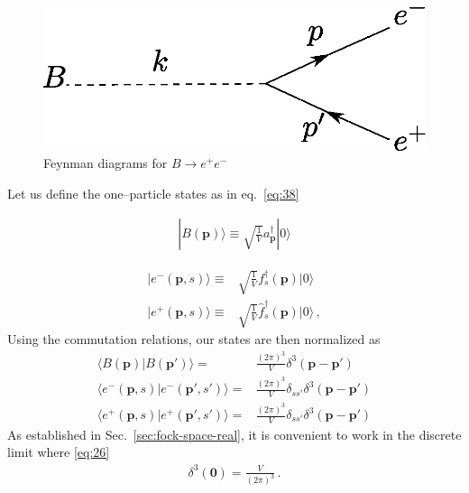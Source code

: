 \begin{figure} %
  \centering %
  \includegraphics[scale=0.6]{Btoee} %
  \caption{Feynman diagrams for $B\to e^+ e^-$} %
  \label{fig:btoee} %
\end{figure} %
Let us define the one--particle states as in eq.~\eqref{eq:38}

\begin{align}
  | B(\mathbf{p})\rangle\equiv\sqrt{\frac{1}{V}}a^\dagger_{\mathbf{p}}|0\rangle 
\end{align}
 
\begin{align}
   | e^-(\mathbf{p},s)\rangle\equiv&\sqrt{\frac{1}{V}}f^\dagger_s(\mathbf{p})|0\rangle\nonumber\\
   | e^+(\mathbf{p},s)\rangle\equiv&\sqrt{\frac{1}{V}}\hat{f}^\dagger_s(\mathbf{p})|0\rangle\,, 
\end{align}
Using the commutation relations, our states are then normalized as
\begin{align}
\langle B(\mathbf{p})| B(\mathbf{p}')\rangle=&\frac{(2\pi)^3}{V}\delta^3(\mathbf{p}-\mathbf{p}')\nonumber\\
\langle e^-(\mathbf{p},s)| e^-(\mathbf{p}',s')\rangle=&\frac{(2\pi)^3}{V}\delta_{s s'}\delta^3(\mathbf{p}-\mathbf{p}')\nonumber\\
\langle e^+(\mathbf{p},s)| e^+(\mathbf{p}',s')\rangle=&\frac{(2\pi)^3}{V}\delta_{s s'}\delta^3(\mathbf{p}-\mathbf{p}')
\end{align}
As established in Sec.~\ref{sec:fock-space-real}, it is convenient to work in the discrete limit where \eqref{eq:26}
\begin{align}
   \delta^3(\mathbf{0})=\frac{V}{(2\pi)^3}\,.
\end{align}


